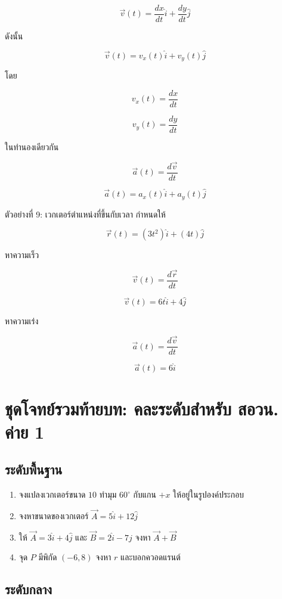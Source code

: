 \[
\vec{v}(t)=\frac{dx}{dt}\hat{i}+\frac{dy}{dt}\hat{j}
\]

ดังนั้น

\[
\vec{v}(t)=v_x(t)\hat{i}+v_y(t)\hat{j}
\]

โดย

\[
v_x(t)=\frac{dx}{dt}
\]

\[
v_y(t)=\frac{dy}{dt}
\]

ในทำนองเดียวกัน

\[
\vec{a}(t)=\frac{d\vec{v}}{dt}
\]

\[
\vec{a}(t)=a_x(t)\hat{i}+a_y(t)\hat{j}
\]

\begin{examplebox}{ตัวอย่างที่ 9: เวกเตอร์ตำแหน่งที่ขึ้นกับเวลา}
กำหนดให้

\[
\vec{r}(t)=(3t^2)\hat{i}+(4t)\hat{j}
\]

หาความเร็ว

\[
\vec{v}(t)=\frac{d\vec{r}}{dt}
\]

\[
\vec{v}(t)=6t\hat{i}+4\hat{j}
\]

หาความเร่ง

\[
\vec{a}(t)=\frac{d\vec{v}}{dt}
\]

\[
\vec{a}(t)=6\hat{i}
\]
\end{examplebox}

\section{ชุดโจทย์รวมท้ายบท: คละระดับสำหรับ สอวน. ค่าย 1}

\subsection*{ระดับพื้นฐาน}

\begin{enumerate}
    \item จงแปลงเวกเตอร์ขนาด $10$ ทำมุม $60^\circ$ กับแกน $+x$ ให้อยู่ในรูปองค์ประกอบ
    \item จงหาขนาดของเวกเตอร์ $\vec{A}=5\hat{i}+12\hat{j}$
    \item ให้ $\vec{A}=3\hat{i}+4\hat{j}$ และ $\vec{B}=2\hat{i}-7\hat{j}$ จงหา $\vec{A}+\vec{B}$
    \item จุด $P$ มีพิกัด $(-6,8)$ จงหา $r$ และบอกควอดแรนต์
\end{enumerate}

\subsection*{ระดับกลาง}

